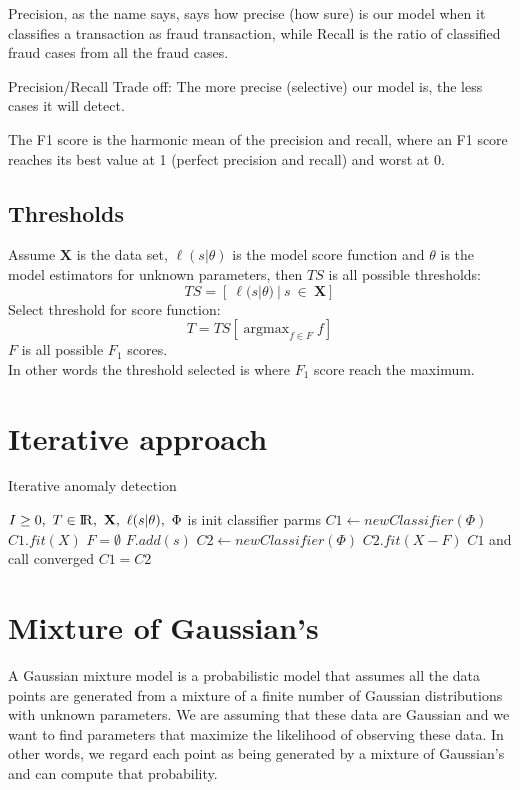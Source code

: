 \documentclass[20pt,a4paper]{article}
\DeclareMathOperator*{\argmax}{argmax} %
\begin{document}
Precision, as the name says, says how precise (how sure) is our model when it classifies a transaction as fraud transaction, while Recall is the ratio of classified fraud cases from all the fraud cases.

Precision/Recall Trade off: The more precise (selective) our model is,
the less cases it will detect.

The F1 score is the harmonic mean of the precision and recall, where an F1 score reaches its best value at 1 (perfect precision and recall) and worst at 0.

\subsection{Thresholds}
Assume $\mathbf{X}$ is the data set, $\ell(s|\theta)$ is the model score function and $\theta$ is the model estimators for unknown parameters, then $TS$ is all possible thresholds:
$$TS = [\ \ell(s|\theta)\ |\ s\ \in\ \mathbf{X}]$$ 
Select threshold for score function:
$$T = TS[ \argmax_{f \in F} f ] $$
$F$ is all possible $F_1$ scores.\\
In other words the threshold selected is where \(F_1\) score reach
the maximum.

\section{Iterative approach}

\begin{algorithm}
\caption{Iterative anomaly detection}
\begin{algorithmic}
\REQUIRE $I \geq 0, \ T \in {\rm I\!R}, \ \mathbf{X}, \ \ell(s|\theta),\ \Phi$ is init classifier parms
\STATE $C1 \leftarrow new Classifier(\Phi)$
    \STATE $C1.fit(X)$
    \STATE $F = \emptyset$
            \STATE $F.add(s)$ 
        \ENDIF
    \ENDFOR
    \STATE $C2 \leftarrow new Classifier(\Phi)$
    \STATE $C2.fit(X-F)$
        \RETURN $C1$ and call converged
    \ELSE
        \STATE $C1=C2$
    \ENDIF
\ENDFOR
\end{algorithmic}
\end{algorithm}

\section{Mixture of Gaussian's}

    A Gaussian mixture model is a probabilistic model that assumes all the
data points are generated from a mixture of a finite number of Gaussian
distributions with unknown parameters. We are assuming that these data
are Gaussian and we want to find parameters that maximize the likelihood
of observing these data. In other words, we regard each point as being
generated by a mixture of Gaussian's and can compute that probability.
\end{document}
